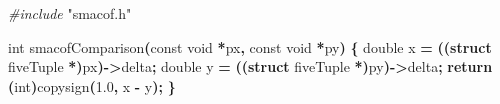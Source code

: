 \documentclass[
  12pt,
]{article}
\newenvironment{Shaded}{\begin{snugshade}}{\end{snugshade}}
\newcommand{\ControlFlowTok}[1]{\textcolor[rgb]{0.13,0.29,0.53}{\textbf{#1}}}
\newcommand{\DataTypeTok}[1]{\textcolor[rgb]{0.13,0.29,0.53}{#1}}
\newcommand{\FloatTok}[1]{\textcolor[rgb]{0.00,0.00,0.81}{#1}}
\newcommand{\ImportTok}[1]{#1}
\newcommand{\KeywordTok}[1]{\textcolor[rgb]{0.13,0.29,0.53}{\textbf{#1}}}
\newcommand{\NormalTok}[1]{#1}
\newcommand{\OperatorTok}[1]{\textcolor[rgb]{0.81,0.36,0.00}{\textbf{#1}}}
\newcommand{\PreprocessorTok}[1]{\textcolor[rgb]{0.56,0.35,0.01}{\textit{#1}}}
\begin{document}
\begin{Shaded}
\begin{Highlighting}[]
\PreprocessorTok{\#include }\ImportTok{"smacof.h"}

\DataTypeTok{int}\NormalTok{ smacofComparison}\OperatorTok{(}\DataTypeTok{const} \DataTypeTok{void} \OperatorTok{*}\NormalTok{px}\OperatorTok{,} \DataTypeTok{const} \DataTypeTok{void} \OperatorTok{*}\NormalTok{py}\OperatorTok{)} \OperatorTok{\{}
    \DataTypeTok{double}\NormalTok{ x }\OperatorTok{=} \OperatorTok{((}\KeywordTok{struct}\NormalTok{ fiveTuple }\OperatorTok{*)}\NormalTok{px}\OperatorTok{){-}\textgreater{}}\NormalTok{delta}\OperatorTok{;}
    \DataTypeTok{double}\NormalTok{ y }\OperatorTok{=} \OperatorTok{((}\KeywordTok{struct}\NormalTok{ fiveTuple }\OperatorTok{*)}\NormalTok{py}\OperatorTok{){-}\textgreater{}}\NormalTok{delta}\OperatorTok{;}
    \ControlFlowTok{return} \OperatorTok{(}\DataTypeTok{int}\OperatorTok{)}\NormalTok{copysign}\OperatorTok{(}\FloatTok{1.0}\OperatorTok{,}\NormalTok{ x }\OperatorTok{{-}}\NormalTok{ y}\OperatorTok{);}
\OperatorTok{\}}


\end{Highlighting}
\end{Shaded}
\end{document}
